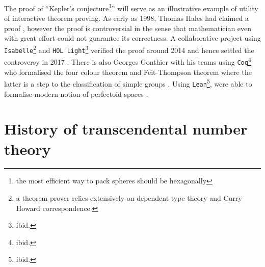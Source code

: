 \documentclass{report}
\theoremstyle{definition}
\theoremstyle{plain}
\begin{document}
The proof of ``Kepler's conjecture\footnote{the most efficient way to pack spheres should be hexagonally}'' will serve as an illustrative example of utility of interactive theorem proving. As early as 1998, Thomas Hales had claimed a proof \cite{hales1998kepler,harrison2014history}, however the proof is controversial in the sense that mathematician even with great effort could not guarantee its correctness. A collaborative project using {\tt Isabelle}\footnote{a theorem prover relies extensively on dependent type theory and Curry-Howard correspondence.} and {\tt HOL Light}\footnote{ibid.} verified the proof around 2014 and hence settled the controversy in 2017 \cite{hales2017formal}. There is also Georges Gonthier with his teams using {\tt Coq}\footnote{ibid.} who formalised the four colour theorem and Feit-Thompson theorem where the latter is a step to the classification of simple groups \cite{gonthier2008formal, gonthier2013machine}. Using {\tt Lean}\footnote{ibid.},  were able to formalise modern notion of perfectoid spaces \cite{buzzard2020formalising}.

\section{History of transcendental number theory}
\end{document}
